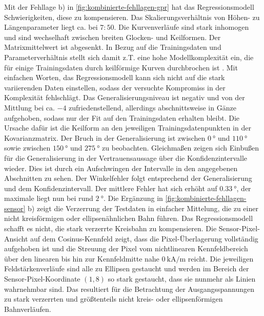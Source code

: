 Mit der Fehllage b) in \autoref{fig:kombinierte-fehllagen-gpr} hat das Regressionsmodell Schwierigkeiten, diese zu kompensieren. Das Skalierungsverhältnis von Höhen- zu Längenparameter liegt ca. bei $7:50$. Die Kurvenverläufe sind stark inhomogen und  sind wechselhaft zwischen breiten Glocken- und Keilformen. Der Matrixmittelwert ist abgesenkt. In Bezug auf die Trainingsdaten und Parameterverhältnis stellt sich damit z.T. eine hohe Modellkomplexität ein, die für einige Trainingsdaten durch keilförmige Kurven durchbrochen ist  \cite{Rasmussen2006}. Mit einfachen Worten, das Regressionsmodell kann sich nicht auf die stark variierenden Daten einstellen, sodass der versuchte Kompromiss in der Komplexität fehlschlägt. Das Generalisierungsniveau ist negativ und von der Mittlung bei ca. $-4$ zufriedenstellend, allerdings abschnittsweise in Gänze aufgehoben, sodass nur der Fit auf den Trainingsdaten erhalten bleibt. Die Ursache dafür ist die Keilform an den jeweiligen Trainingsdatenpunkten in der Kovarianzmatrix. Der Bruch in der Generalisierung ist zwischen $\SI{0}{\degree}$ und $\SI{110}{\degree}$ sowie zwischen $\SI{150}{\degree}$ und $\SI{275}{\degree}$ zu beobachten. Gleichmaßen zeigen sich Einbußen für die Generalisierung in der Vertrauensaussage über die Konfidenzintervalle wieder. Dies ist durch ein Aufschwingen der Intervalle in den angegebenen Abschnitten zu sehen. Der Winkelfehler folgt entsprechend der Generalisierung und dem Konfidenzintervall. Der mittlere Fehler hat sich erhöht auf $\SI{0,33}{\degree}$, der maximale liegt nun bei rund $\SI{2}{\degree}$. Die Ergänzung in \autoref{fig:kombinierte-fehllagen-sensor} b) zeigt die Verzerrung der Testdaten in einfacher Mittelung, die zu einer nicht kreisförmigen oder ellipsenähnlichen Bahn führen. Das Regressionsmodell schafft es nicht, die stark verzerrte Kreisbahn zu kompensieren. Die Sensor-Pixel-Ansicht auf dem Cosinus-Kennfeld zeigt, dass die Pixel-Überlagerung vollständig aufgehoben ist und die Streuung der Pixel vom nichtlinearen Kennfeldbereich über den linearen bis hin zur Kennfeldmitte nahe $\SI{0}{\kilo\ampere\per\metre}$ reicht. Die jeweiligen Feldstärkenverläufe sind alle zu Ellipsen gestaucht und werden im Bereich der Sensor-Pixel-Koordinate $(1,8)$ so stark gestaucht, dass sie nunmehr als Linien wahrnehmbar sind. Das resultiert für die Betrachtung der Ausgangsspannungen zu stark verzerrten und größtenteils nicht kreis- oder ellipsenförmigen Bahnverläufen.


